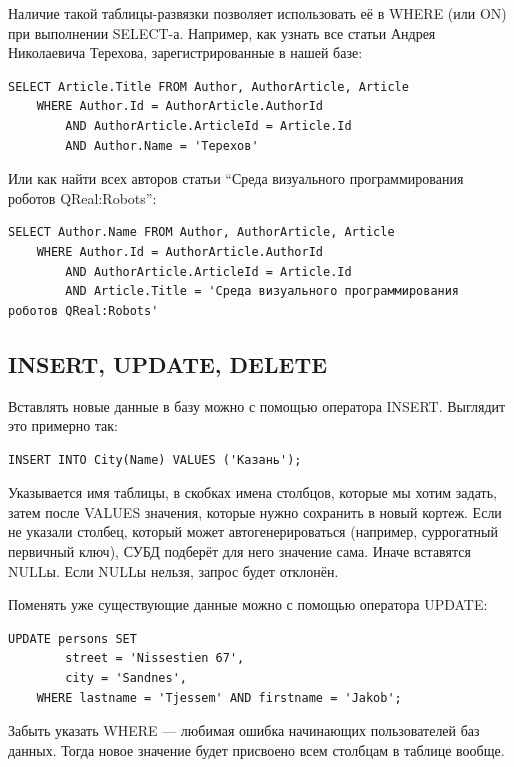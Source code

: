 \documentclass[a5paper]{article}
\begin{document}
Наличие такой таблицы-развязки позволяет использовать её в WHERE (или ON) при выполнении SELECT-а. Например, как узнать все статьи Андрея Николаевича Терехова, зарегистрированные в нашей базе:

\begin{verbatim}
SELECT Article.Title FROM Author, AuthorArticle, Article 
    WHERE Author.Id = AuthorArticle.AuthorId 
        AND AuthorArticle.ArticleId = Article.Id 
        AND Author.Name = 'Терехов'
\end{verbatim}

Или как найти всех авторов статьи ``Среда визуального программирования роботов QReal:Robots'':

\begin{verbatim}
SELECT Author.Name FROM Author, AuthorArticle, Article 
    WHERE Author.Id = AuthorArticle.AuthorId 
        AND AuthorArticle.ArticleId = Article.Id 
        AND Article.Title = 'Среда визуального программирования роботов QReal:Robots'
\end{verbatim}

\subsection{INSERT, UPDATE, DELETE}

Вставлять новые данные в базу можно с помощью оператора INSERT. Выглядит это примерно так:

\begin{verbatim}
INSERT INTO City(Name) VALUES ('Казань');
\end{verbatim}

Указывается имя таблицы, в скобках имена столбцов, которые мы хотим задать, затем после VALUES значения, которые нужно сохранить в новый кортеж. Если не указали столбец, который может автогенерироваться (например, суррогатный первичный ключ), СУБД подберёт для него значение сама. Иначе вставятся NULLы. Если NULLы нельзя, запрос будет отклонён.

Поменять уже существующие данные можно с помощью оператора UPDATE:

\begin{verbatim}
UPDATE persons SET
        street = 'Nissestien 67',
        city = 'Sandnes',
    WHERE lastname = 'Tjessem' AND firstname = 'Jakob';
\end{verbatim}

Забыть указать WHERE --- любимая ошибка начинающих пользователей баз данных. Тогда новое значение будет присвоено всем столбцам в таблице вообще.
\end{document}
